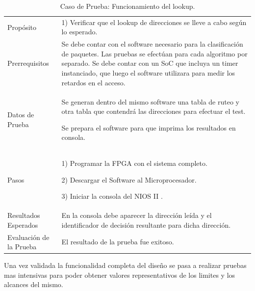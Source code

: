 \begin{table}
	\begin{tabular}{|>{\columncolor[gray]{0.8}}l|p{11cm}|} \hline
\multicolumn{2}{|>{\columncolor[gray]{0.8}}l|}{\textbf{Caso de Prueba: Funcionamiento de los algoritmos de clasificación }}\\ \hline
Propósito  & 1) Verificar que el lookup de direcciones se lleve a cabo según lo esperado.

\\ \hline
 Prerrequisitos  & Se debe contar con el software necesario para la clasificación de paquetes. Las pruebas se efectúan para cada algoritmo por separado. Se debe contar con un SoC que incluya un timer instanciado, que luego el software utilizara para medir los retardos en el acceso.
 \\ \hline
 Datos de Prueba & Se generan dentro del mismo software una tabla de ruteo y otra tabla que contendrá las direcciones para efectuar el test. 

Se prepara el software para que imprima los resultados en consola. 
 \\ \hline
 Pasos & 1) Programar la FPGA con el sistema completo.

2) Descargar el Software al Microprocesador. 

3) Iniciar la consola del NIOS II .
\\ \hline
 Resultados Esperados & En la consola debe aparecer la dirección leída y el identificador de decisión resultante para dicha dirección. \\ \hline
 Evaluación de la Prueba  & El resultado de la prueba fue exitoso.\\ \hline
	\end{tabular}
	\caption{Caso de Prueba: Funcionamiento del lookup.}
	\label{tab:retlook}
\end{table}

Una vez validada la funcionalidad completa del diseño se pasa a realizar pruebas mas intensivas para poder obtener valores representativos de los limites y los alcances del mismo.

